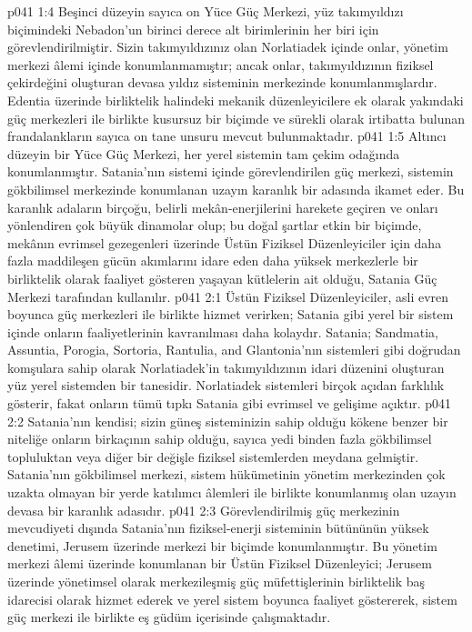 \vs p041 1:4 Beşinci düzeyin sayıca on Yüce Güç Merkezi, yüz takımyıldızı biçimindeki Nebadon’un birinci derece alt birimlerinin her biri için görevlendirilmiştir. Sizin takımyıldızınız olan Norlatiadek içinde onlar, yönetim merkezi âlemi içinde konumlanmamıştır; ancak onlar, takımyıldızının fiziksel çekirdeğini oluşturan devasa yıldız sisteminin merkezinde konumlanmışlardır. Edentia üzerinde birliktelik halindeki mekanik düzenleyicilere ek olarak yakındaki güç merkezleri ile birlikte kusursuz bir biçimde ve sürekli olarak irtibatta bulunan frandalankların sayıca on tane unsuru mevcut bulunmaktadır.
\vs p041 1:5 Altıncı düzeyin bir Yüce Güç Merkezi, her yerel sistemin tam çekim odağında konumlanmıştır. Satania’nın sistemi içinde görevlendirilen güç merkezi, sistemin gökbilimsel merkezinde konumlanan uzayın karanlık bir adasında ikamet eder. Bu karanlık adaların birçoğu, belirli mekân\hyp{}enerjilerini harekete geçiren ve onları yönlendiren çok büyük dinamolar olup; bu doğal şartlar etkin bir biçimde, mekânın evrimsel gezegenleri üzerinde Üstün Fiziksel Düzenleyiciler için daha fazla maddileşen gücün akımlarını idare eden daha yüksek merkezlerle bir birliktelik olarak faaliyet gösteren yaşayan kütlelerin ait olduğu, Satania Güç Merkezi tarafından kullanılır.
\vs p041 2:1 Üstün Fiziksel Düzenleyiciler, asli evren boyunca güç merkezleri ile birlikte hizmet verirken; Satania gibi yerel bir sistem içinde onların faaliyetlerinin kavranılması daha kolaydır. Satania; Sandmatia, Assuntia, Porogia, Sortoria, Rantulia, and Glantonia’nın sistemleri gibi doğrudan komşulara sahip olarak Norlatiadek’in takımyıldızının idari düzenini oluşturan yüz yerel sistemden bir tanesidir. Norlatiadek sistemleri birçok açıdan farklılık gösterir, fakat onların tümü tıpkı Satania gibi evrimsel ve gelişime açıktır.
\vs p041 2:2 Satania’nın kendisi; sizin güneş sisteminizin sahip olduğu kökene benzer bir niteliğe onların birkaçının sahip olduğu, sayıca yedi binden fazla gökbilimsel topluluktan veya diğer bir değişle fiziksel sistemlerden meydana gelmiştir. Satania’nın gökbilimsel merkezi, sistem hükümetinin yönetim merkezinden çok uzakta olmayan bir yerde katılımcı âlemleri ile birlikte konumlanmış olan uzayın devasa bir karanlık adasıdır.
\vs p041 2:3 Görevlendirilmiş güç merkezinin mevcudiyeti dışında Satania’nın fiziksel\hyp{}enerji sisteminin bütününün yüksek denetimi, Jerusem üzerinde merkezi bir biçimde konumlanmıştır. Bu yönetim merkezi âlemi üzerinde konumlanan bir Üstün Fiziksel Düzenleyici; Jerusem üzerinde yönetimsel olarak merkezileşmiş güç müfettişlerinin birliktelik baş idarecisi olarak hizmet ederek ve yerel sistem boyunca faaliyet göstererek, sistem güç merkezi ile birlikte eş güdüm içerisinde çalışmaktadır.
